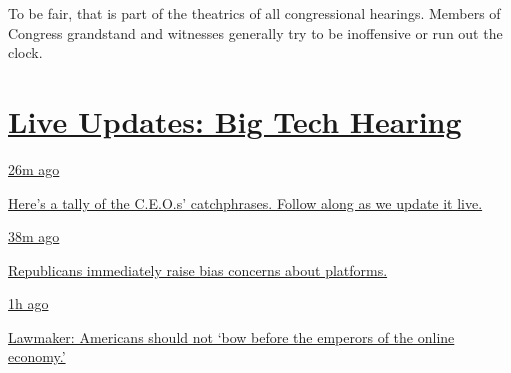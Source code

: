 To be fair, that is part of the theatrics of all congressional hearings.
Members of Congress grandstand and witnesses generally try to be
inoffensive or run out the clock.

\hypertarget{live-updates-big-tech-hearing}{%
\section{\texorpdfstring{\href{https://www.nytimes.com/live/2020/07/29/technology/tech-ceos-hearing-testimony?action=click\&pgtype=Article\&state=default\&region=MAIN_CONTENT_1\&context=storylines_live_updates}{Live
Updates: Big Tech
Hearing}}{Live Updates: Big Tech Hearing}}\label{live-updates-big-tech-hearing}}

\href{https://www.nytimes.com/live/2020/07/29/technology/tech-ceos-hearing-testimony?action=click\&pgtype=Article\&state=default\&region=MAIN_CONTENT_1\&context=storylines_live_updates\#what-ceos-said}{26m
ago}

\href{https://www.nytimes.com/live/2020/07/29/technology/tech-ceos-hearing-testimony?action=click\&pgtype=Article\&state=default\&region=MAIN_CONTENT_1\&context=storylines_live_updates\#what-ceos-said}{Here's
a tally of the C.E.O.s' catchphrases. Follow along as we update it
live.}

\href{https://www.nytimes.com/live/2020/07/29/technology/tech-ceos-hearing-testimony?action=click\&pgtype=Article\&state=default\&region=MAIN_CONTENT_1\&context=storylines_live_updates\#republicans-immediately-raise-bias-concerns-about-platforms}{38m
ago}

\href{https://www.nytimes.com/live/2020/07/29/technology/tech-ceos-hearing-testimony?action=click\&pgtype=Article\&state=default\&region=MAIN_CONTENT_1\&context=storylines_live_updates\#republicans-immediately-raise-bias-concerns-about-platforms}{Republicans
immediately raise bias concerns about platforms.}

\href{https://www.nytimes.com/live/2020/07/29/technology/tech-ceos-hearing-testimony?action=click\&pgtype=Article\&state=default\&region=MAIN_CONTENT_1\&context=storylines_live_updates\#lawmaker-americans-should-not-bow-before-the-emperors-of-the-online-economy}{1h
ago}

\href{https://www.nytimes.com/live/2020/07/29/technology/tech-ceos-hearing-testimony?action=click\&pgtype=Article\&state=default\&region=MAIN_CONTENT_1\&context=storylines_live_updates\#lawmaker-americans-should-not-bow-before-the-emperors-of-the-online-economy}{Lawmaker:
Americans should not `bow before the emperors of the online economy.'}

